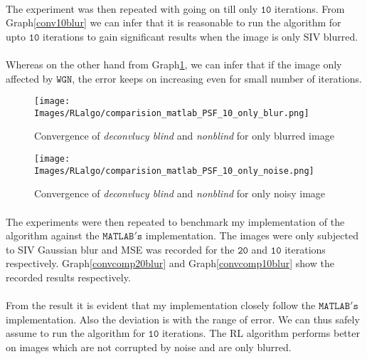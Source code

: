 \documentclass[a4paper]{book}
\begin{document}
\paragraph*{}The experiment was then repeated with going on till only $ \mathtt{10} $ iterations. From Graph\ref{conv10blur} we can infer that it is reasonable to run the algorithm for upto $ \mathtt{10} $ iterations to gain significant results when the image is only SIV blurred. 
\paragraph*{} Whereas on the other hand from Graph\ref{conv10noisy}, we can infer that if the image only affected by $ \mathtt{WGN} $, the error keeps on increasing even for small number of iterations.


\begin{figure}[H]
	\centering
	\begin{minipage}{0.45\textwidth}
		\centering
		\texttt{[image: Images/RLalgo/comparision\_matlab\_PSF\_10\_only\_blur.png]}
		\caption[RL convergence on blurred image ]{Convergence of \textit{deconvlucy blind} and \textit{nonblind} for only blurred image}
		\label{conv10blur}
	\end{minipage}\hfill
	\begin{minipage}{0.45\textwidth}
		\centering
		\texttt{[image: Images/RLalgo/comparision\_matlab\_PSF\_10\_only\_noise.png]}
		\caption[RL convergence on noisy image]{Convergence of \textit{deconvlucy blind} and \textit{nonblind} for only noisy image}
		\label{conv10noisy}
	\end{minipage}
\end{figure}


\paragraph*{} The experiments were then repeated to benchmark my implementation of the algorithm against the $ \mathtt{MATLAB's} $ implementation. The images were only subjected to SIV Gaussian blur and MSE was recorded for the $ \mathtt{20} $ and $ \mathtt{10} $ iterations respectively.
Graph\ref{convcomp20blur} and Graph\ref{convcomp10blur} show the recorded results respectively.
\paragraph*{} From the result it is evident that my implementation closely follow the $ \mathtt{MATLAB's} $ implementation. Also the deviation is with the range of error. We can thus safely assume to run the algorithm for $ \mathtt{10} $ iterations. The RL algorithm performs better on images which are not corrupted by noise and are only blurred.
\end{document}
